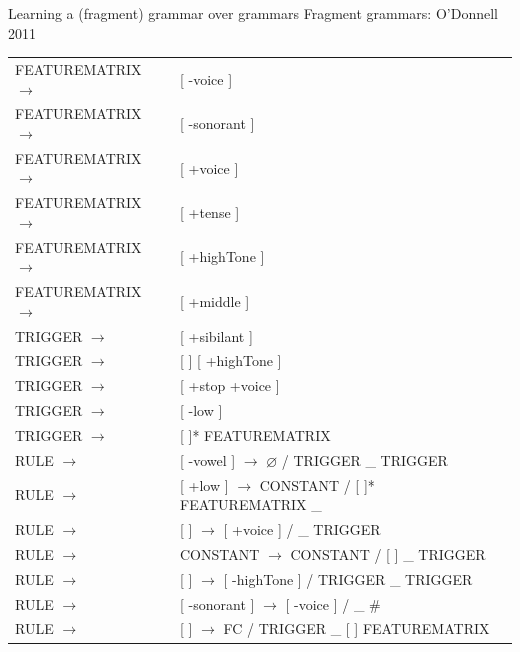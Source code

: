 \documentclass{beamer}
\begin{document}
\begin{frame}{Learning a (fragment) grammar over grammars}
  Fragment grammars: O'Donnell 2011
  \small
  \begin{tabular}{ll}
    FEATUREMATRIX $\to$& [ -voice ]\\
     FEATUREMATRIX $\to$& [ -sonorant ]\\
 FEATUREMATRIX $\to$& [ +voice ]\\
 FEATUREMATRIX $\to$& [ +tense ]\\
 FEATUREMATRIX $\to$& [ +highTone ]\\
 FEATUREMATRIX $\to$& [ +middle ]\\
 TRIGGER $\to$& [ +sibilant ]\\
 TRIGGER $\to$& [ ] [ +highTone ]\\
 TRIGGER $\to$& [ +stop +voice ]\\
 TRIGGER $\to$& [ -low ]\\
 TRIGGER $\to$& [ ]* FEATUREMATRIX\\
 RULE $\to$& {\color{red}[ -vowel ] $\to$ $\varnothing$ / TRIGGER \_ TRIGGER}\\
 RULE $\to$& [ +low ] $\to$ CONSTANT / [ ]* FEATUREMATRIX \_\\
 RULE $\to$& [ ] $\to$ [ +voice ] / \_ TRIGGER\\
 RULE $\to$& CONSTANT $\to$ CONSTANT / [ ] \_ TRIGGER\\
 RULE $\to$& [ ] $\to$ [ -highTone ] / TRIGGER \_ TRIGGER\\
 RULE $\to$& {\color{red}[ -sonorant ] $\to$ [ -voice ] / \_ \#}\\
 RULE $\to$& [ ] $\to$ FC / TRIGGER \_ [ ] FEATUREMATRIX\\
  \end{tabular}

    
\end{frame}
\end{document}
